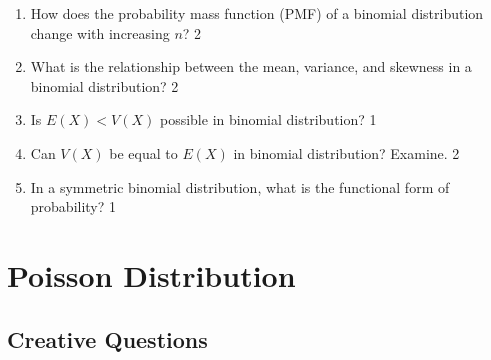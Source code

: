 \documentclass[a4paper,oneside, margin=1.4in]{book}
\begin{document}
\begin{enumerate}
\item How does the probability mass function (PMF) of a binomial distribution change with increasing \( n \)? \hfill 2

\item What is the relationship between the mean, variance, and skewness in a binomial distribution? \hfill 2

\item Is $E(X) < V(X)$ possible in binomial distribution? \hfill 1

\item Can $V(X)$ be equal to $E(X)$ in binomial distribution? Examine. \hfill 2

\item In a symmetric binomial distribution, what is the functional form of probability? \hfill 1


 \end{enumerate}

\chapter{Poisson Distribution} 
\section{Creative Questions}
\end{document}
